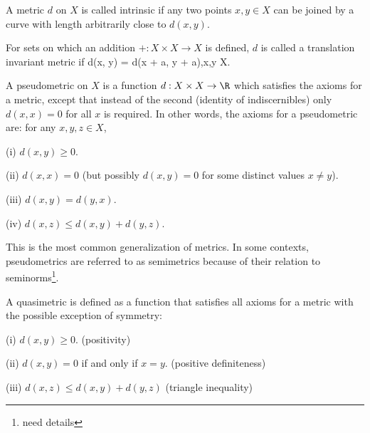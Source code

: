 \begin{definition}\label{def:intrinsic_metric}
A metric $d$ on $X$ is called intrinsic if any two points $x,y \in X$ can be joined by a curve with length arbitrarily close to $d(x, y)$.
\end{definition}

\begin{definition}\label{def:translation_invariant_metric}
For sets on which an addition $+ : X \times X \to X$ is defined, $d$ is called a translation invariant metric if
\be
d(x, y) = d(x + a, y + a),\quad x,y \in X.
\ee
\end{definition}


\begin{definition}\label{def:pseudometric}
A pseudometric on $X$ is a function $d : X \times X \to \R$ which satisfies the axioms for a metric, except that instead of the second (identity of indiscernibles) only $d(x,x)=0$ for all $x$ is required. In other words, the axioms for a pseudometric are: for any $x,y,z \in X$,
\ben
\item [(i)] $d(x, y) \geq 0$.
\item [(ii)] $d(x, x) = 0$ (but possibly $d(x,y)=0$ for some distinct values $x\neq y$).
\item [(iii)] $d(x, y) = d(y, x)$.
\item [(iv)] $d(x, z) \leq  d(x, y) + d(y, z)$.
\een
\end{definition}

\begin{remark}
This is the most common generalization of metrics. In some contexts, pseudometrics are referred to as semimetrics because of their relation to seminorms\footnote{need details}.
\end{remark}

\begin{definition}\label{def:quasimetric}
A quasimetric is defined as a function that satisfies all axioms for a metric with the possible exception of symmetry:
\ben
\item [(i)] $d(x, y) \geq 0$. (positivity)
\item [(ii)] $d(x, y) = 0$ if and only if $x = y$. (positive definiteness)
\item [(iii)] $d(x, z) \leq d(x, y) + d(y, z)$ (triangle inequality)
\een
\end{definition}

